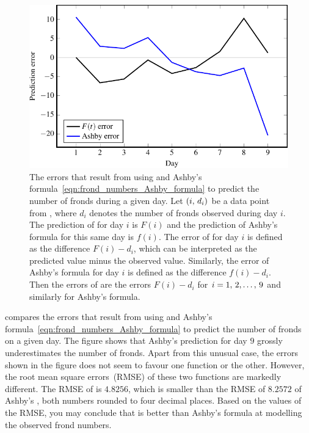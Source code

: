 \documentclass[a4paper,oneside,12pt]{article}
\begin{document}
\begin{problem}
{\begin{solution}
\begin{figure}[!htbp]
\centering
\includegraphics[scale=1.1]{image/11/frond-errors.pdf}
\caption{%
  The errors that result from using
   and Ashby's
  formula~\eqref{eqn:frond_numbers_Ashby_formula} to predict the
  number of fronds during a given day.  Let $\left\lparen{i},\, {d_i}\right\rparen$ be a data
  point from , where $d_i$ denotes
  the number of fronds observed during day $i$.  The prediction of
   for day $i$ is
  $F(i)$ and the prediction of Ashby's formula for this same day is
  $f(i)$.  The error of
   for day $i$ is
  defined as the difference $F(i) - d_i$, which can be interpreted as
  the predicted value minus the observed value.  Similarly, the error
  of Ashby's formula for day $i$ is defined as the difference
  $f(i) - d_i$.  Then the errors of
   are the errors
  $F(i) - d_i$ for $i = {1},\, {2}, \dots,\, {9}$ and similarly for Ashby's
  formula.
}
\label{fig:frond_error_analysis}
\end{figure}

 compares the errors that result from
using  and Ashby's
formula~\eqref{eqn:frond_numbers_Ashby_formula} to predict the number
of fronds on a given day.  The figure shows that Ashby's prediction
for day $9$ grossly underestimates the number of fronds.  Apart from
this unusual case, the errors shown in the figure does not seem to
favour one function or the other.  However, the root mean square
errors~(RMSE) of these two functions are markedly different.  The RMSE
of  is $4.8256$,
which is smaller than the RMSE of $8.2572$ of Ashby's
, both numbers rounded to
four decimal places.  Based on the values of the RMSE, you may
conclude that  is
better than Ashby's formula at modelling the observed frond numbers.
\end{solution}
}{}


\end{problem}
\end{document}
